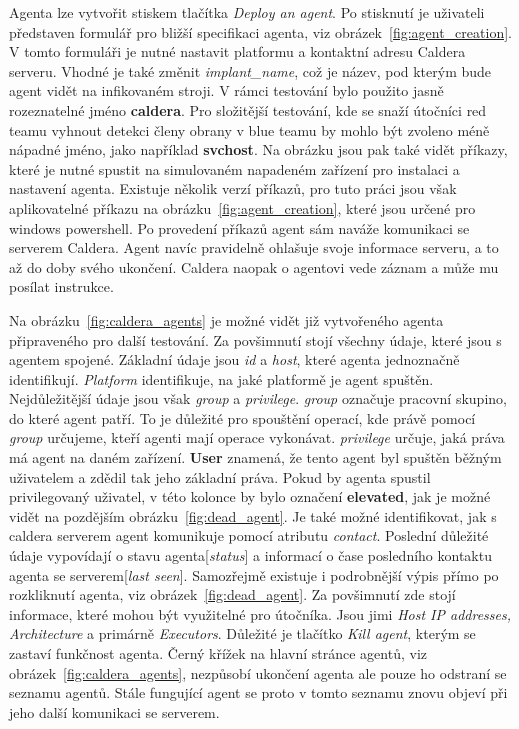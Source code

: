 Agenta lze vytvořit stiskem tlačítka \textit{Deploy an agent}.
Po stisknutí je uživateli představen formulář pro bližší specifikaci agenta, viz obrázek~\ref{fig:agent_creation}.
V tomto formuláři je nutné nastavit platformu a kontaktní adresu Caldera serveru.
Vhodné je také změnit \textit{implant\_name}, což je název, pod kterým bude agent vidět na infikovaném stroji.
V rámci testování bylo použito jasně rozeznatelné jméno \textbf{caldera}.
Pro složitější testování, kde se snaží útočníci red teamu vyhnout detekci členy obrany v blue teamu by mohlo být zvoleno méně nápadné jméno, jako například \textbf{svchost}.
Na obrázku jsou pak také vidět příkazy, které je nutné spustit na simulovaném napadeném zařízení pro instalaci a nastavení agenta.
Existuje několik verzí příkazů, pro tuto práci jsou však aplikovatelné příkazu na obrázku~\ref{fig:agent_creation}, které jsou určené pro windows powershell.
Po provedení příkazů agent sám naváže komunikaci se serverem Caldera.
Agent navíc pravidelně ohlašuje svoje informace serveru, a to až do doby svého ukončení.
Caldera naopak o agentovi vede záznam a může mu posílat instrukce.


Na obrázku~\ref{fig:caldera_agents} je možné vidět již vytvořeného agenta připraveného pro další testování.
Za povšimnutí stojí všechny údaje, které jsou s agentem spojené.
Základní údaje jsou \textit{id} a \textit{host}, které agenta jednoznačně identifikují.
\textit{Platform} identifikuje, na jaké platformě je agent spuštěn.
Nejdůležitější údaje jsou však \textit{group} a \textit{privilege}.
\textit{group} označuje pracovní skupino, do které agent patří.
To je důležité pro spouštění operací, kde právě pomocí \textit{group} určujeme, kteří agenti mají operace vykonávat.
\textit{privilege} určuje, jaká práva má agent na daném zařízení.
\textbf{User} znamená, že tento agent byl spuštěn běžným uživatelem a zdědil tak jeho základní práva.
Pokud by agenta spustil privilegovaný uživatel, v této kolonce by bylo označení \textbf{elevated}, jak je možné vidět na pozdějším obrázku~\ref{fig:dead_agent}.
Je také možné identifikovat, jak s caldera serverem agent komunikuje pomocí atributu \textit{contact}.
Poslední důležité údaje vypovídají o stavu agenta[\textit{status}] a informací o čase posledního kontaktu agenta se serverem[\textit{last seen}].
Samozřejmě existuje i podrobnější výpis přímo po rozkliknutí agenta, viz obrázek~\ref{fig:dead_agent}.
Za povšimnutí zde stojí informace, které mohou být využitelné pro útočníka.
Jsou jimi \textit{Host IP addresses, Architecture} a primárně \textit{Executors}.
Důležité je tlačítko \textit{Kill agent}, kterým se zastaví funkčnost agenta.
Černý křížek na hlavní stránce agentů, viz obrázek~\ref{fig:caldera_agents}, nezpůsobí ukončení agenta ale pouze ho odstraní se seznamu agentů.
Stále fungující agent se proto v tomto seznamu znovu objeví při jeho další komunikaci se serverem.

